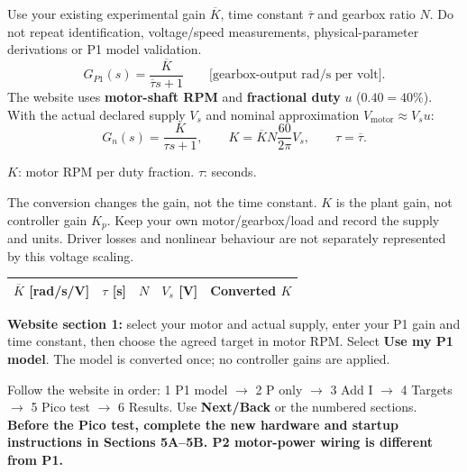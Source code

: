 \documentclass[11pt,a4paper]{article}
\newcommand{\ui}[1]{\textbf{#1}}
\newcommand{\note}[1]{\par\begingroup\setlength{\fboxsep}{7pt}\noindent\colorbox{pale}{\parbox{\dimexpr\linewidth-14pt\relax}{#1}}\endgroup\par}
\begin{document}
Use your existing experimental gain $\overline K$, time constant $\overline\tau$ and gearbox ratio $N$. Do not repeat identification, voltage/speed measurements, physical-parameter derivations or P1 model validation.
\[
G_{P1}(s)=\frac{\overline K}{\overline\tau s+1}
\qquad\text{[gearbox-output rad/s per volt].}
\]
The website uses \textbf{motor-shaft RPM} and \textbf{fractional duty} $u$ ($0.40=40\%$). With the actual declared supply $V_s$ and nominal approximation $V_{\mathrm{motor}}\approx V_su$:
\[
G_n(s)=\frac{K}{\tau s+1},\qquad K=\overline K N\frac{60}{2\pi}V_s,\qquad \tau=\overline\tau.
\]
\centerline{\small $K$: motor RPM per duty fraction. $\tau$: seconds.}
The conversion changes the gain, not the time constant. $K$ is the plant gain, not controller gain $K_p$. Keep your own motor/gearbox/load and record the supply and units. Driver losses and nonlinear behaviour are not separately represented by this voltage scaling.
\par\noindent\begin{tabularx}{\linewidth}{@{}YYYYY@{}}
\toprule
$\overline K$ [rad/s/V]&$\tau$ [s]&$N$&$V_s$ [V]&Converted $K$\\[16pt]\bottomrule
\end{tabularx}\par
\note{\textbf{Website section 1:} select your motor and actual supply, enter your P1 gain and time constant, then choose the agreed target in motor RPM. Select \ui{Use my P1 model}. The model is converted once; no controller gains are applied.}
Follow the website in order: 1 P1 model $\to$ 2 P only $\to$ 3 Add I $\to$ 4 Targets $\to$ 5 Pico test $\to$ 6 Results. Use \ui{Next/Back} or the numbered sections.
\textbf{Before the Pico test, complete the new hardware and startup instructions in Sections 5A--5B. P2 motor-power wiring is different from P1.}
\end{document}
